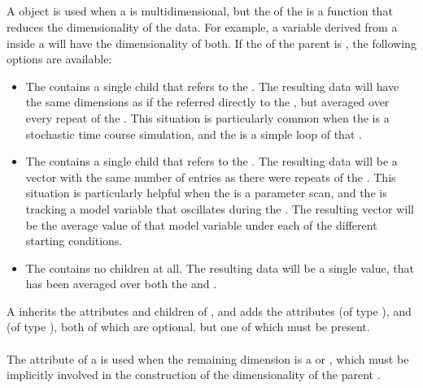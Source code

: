 \begin{blockChanged}
\subsection{}
\label{class:remainingDimension}
\label{class:listOfRemainingDimensions}

A \RemainingDimension object is used when a \Variable is multidimensional, but the  of the \Variable is a function that reduces the dimensionality of the data.  For example, a variable derived from a \Task inside a \RepeatedTask will have the dimensionality of both.  If the  of the parent \Variable is , the following options are available:

\begin{itemize}
        \item The \Variable contains a single \RemainingDimension child that refers to the \Task.  The resulting data will have the same dimensions as if the \Variable referred directly to the \Task, but averaged over every repeat of the \RepeatedTask.  This situation is particularly common when the \Task is a stochastic time course simulation, and the \RepeatedTask is a simple loop of that \Task.
        \item The \Variable contains a single \RemainingDimension child that refers to the \RepeatedTask.  The resulting data will be a vector with the same number of entries as there were repeats of the \RepeatedTask.  This situation is particularly helpful when the \RepeatedTask is a parameter scan, and the \Variable is tracking a model variable that oscillates during the \Task.  The resulting vector will be the average value of that model variable under each of the different starting conditions.
        \item The \Variable contains no \RemainingDimension children at all.  The resulting data will be a single value, that has been averaged over both the \Task and \RepeatedTask.
\end{itemize}

A \RemainingDimension inherits the attributes and children of \SedBase, and adds the attributes  (of type \SIdRef), and  (of type ), both of which are optional, but one of which must be present.

\paragraph*{}
The  attribute of a \RemainingDimension is used when the remaining dimension is a \Task or \RepeatedTask, which must be implicitly involved in the construction of the dimensionality of the parent \Variable.


\end{blockChanged}
